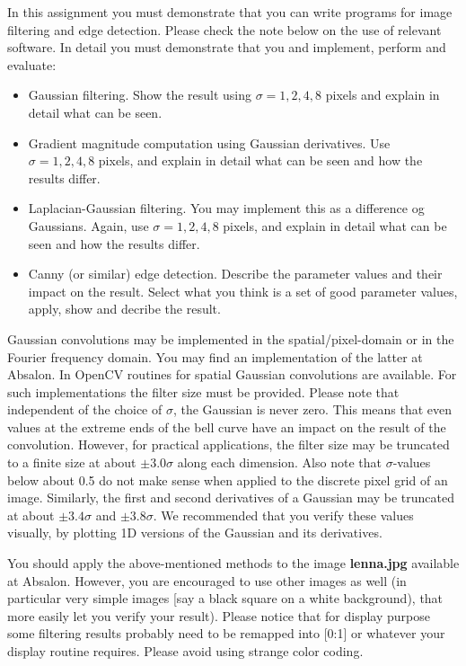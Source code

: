 \documentclass[a4paper,12pts]{article}
\begin{document}
In this assignment you must demonstrate that you can write programs
for image filtering and edge detection. Please check the note below on
the use of relevant software.  In detail you must demonstrate that you
and implement, perform and evaluate: 
\newpage

\begin{itemize} 
\item Gaussian filtering. Show the result using $\sigma = 1, 2, 4, 8$
  pixels and explain in detail what can be seen.
\item Gradient magnitude computation using Gaussian derivatives.
  Use $\sigma = 1, 2, 4, 8$ pixels, and explain in detail what can be
  seen and how the results differ.
\item Laplacian-Gaussian filtering. You may implement this as a
  difference og Gaussians. Again,  use $\sigma = 1, 2, 4, 8$ pixels,
  and explain in detail what can be seen and how the results differ. 
\item Canny (or similar) edge detection. Describe the parameter values
  and their impact on the result. Select what you think is a set of
  good parameter values, apply, show and decribe the result.
\end{itemize}

Gaussian convolutions may be implemented in the spatial/pixel-domain
or in the Fourier frequency domain.  You may find an implementation of
the latter at Absalon. In OpenCV routines for spatial Gaussian
convolutions are available. For such implementations the filter size
must be provided. Please note that independent of the choice of
$\sigma$, the Gaussian is never zero. This means that even values at
the extreme ends of the bell curve have an impact on the result of the
convolution. However, for practical applications, the filter size may
be truncated to a finite size at about $\pm 3.0 \sigma$ along each
dimension. Also note that $\sigma$-values below about 0.5 do not make
sense when applied to the discrete pixel grid of an image. Similarly, the
first and second derivatives of a Gaussian may be truncated at about
$\pm 3.4 \sigma$ and $\pm 3.8\sigma$. We recommended that you verify
these values visually, by plotting 1D versions of the Gaussian and its
derivatives.  \bigskip 

You should apply the above-mentioned methods to the image 
{\bf lenna.jpg} available at Absalon. However, you are encouraged to
use other images as well (in particular very simple images [say a
black square on a white background), that more easily let you verify
your result).  Please notice that for display purpose some filtering
results probably need to be remapped into [0:1] or whatever your
display routine requires. Please avoid using strange color coding.
\bigskip
\end{document}
